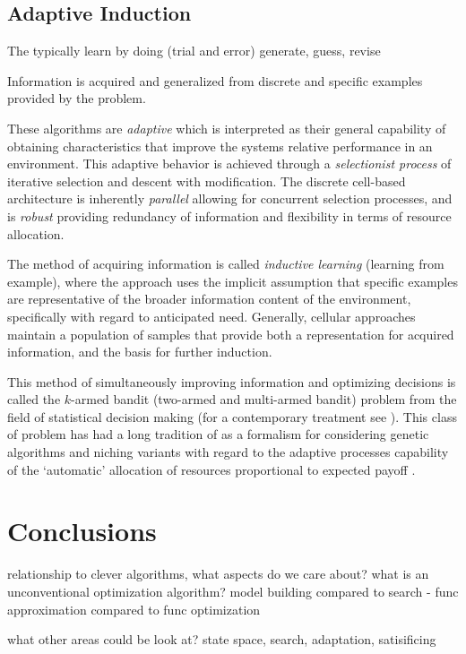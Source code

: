 \documentclass[a4paper, 11pt]{article}
\begin{document}
% 
% 
\subsection{Adaptive Induction}
\label{subsec:induction}
The typically learn by doing (trial and error)
generate, guess, revise

Information is acquired and generalized from discrete and specific examples provided by the problem.

These algorithms are \emph{adaptive} which is interpreted as their general capability of obtaining characteristics that improve the systems relative performance in an environment. This adaptive behavior is achieved through a \emph{selectionist process} of iterative selection and descent with modification. The discrete cell-based architecture is inherently \emph{parallel} allowing for concurrent selection processes, and is \emph{robust} providing redundancy of information and flexibility in terms of resource allocation. 

The method of acquiring information is called \emph{inductive learning} (learning from example), where the approach uses the implicit assumption that specific examples are representative of the broader information content of the environment, specifically with regard to anticipated need. Generally, cellular approaches maintain a population of samples that provide both a representation for acquired information, and the basis for further induction.

This method of simultaneously improving information and optimizing decisions is called the $k$-armed bandit (two-armed and multi-armed bandit) problem from the field of statistical decision making \cite{Robbins1952} (for a contemporary treatment see \cite{Bergemann2006}). This class of problem has had a long tradition of as a formalism for considering genetic algorithms and niching variants with regard to the adaptive processes capability of the `automatic' allocation of resources proportional to expected payoff \cite{Goldberg1989}.







% 
% 
\section{Conclusions}
\label{sec:conclusions}
relationship to clever algorithms, what aspects do we care about?
what is an unconventional optimization algorithm?
model building compared to search - func approximation compared to func optimization

what other areas could be look at?
state space, search, adaptation, satisificing





\end{document}
